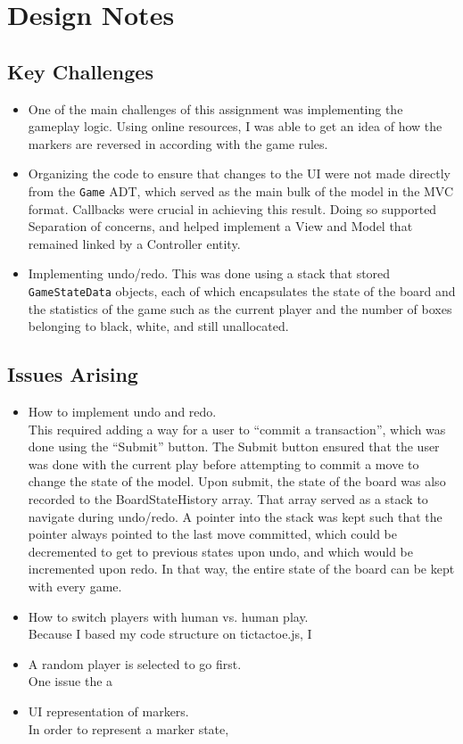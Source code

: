 \documentclass[11pt,letterpaper]{article}
\begin{document}
\section{Design Notes}
\subsection{Key Challenges}
\begin{itemize}
\item One of the main challenges of this assignment was implementing the gameplay logic. Using online resources, I was able to get an idea of how the markers are reversed in according with the game rules.
\item Organizing the code to ensure that changes to the UI were not made directly from the \texttt{Game} ADT, which served as the main bulk of the model in the MVC format. Callbacks were crucial in achieving this result. Doing so supported Separation of concerns, and helped implement a View and Model that remained linked by a Controller entity.
\item Implementing undo/redo. This was done using a stack that stored \texttt{GameStateData} objects, each of which encapsulates the state of the board and the statistics of the game such as the current player and the number of boxes belonging to black, white, and still unallocated. 
\end{itemize}

\subsection{Issues Arising}
\begin{itemize}
\item How to implement undo and redo.\\
This required adding a way for a user to ``commit a transaction'', which was done using the ``Submit'' button. The Submit button ensured that the user was done with the current play before attempting to commit a move to change the state of the model. Upon submit, the state of the board was also recorded to the BoardStateHistory array. That array served as a stack to navigate during undo/redo. A pointer into the stack was kept such that the pointer always pointed to the last move committed, which could be decremented to get to previous states upon undo, and which would be incremented upon redo. In that way, the entire state of the board can be kept with every game.
\item How to switch players with human vs. human play.\\
Because I based my code structure on tictactoe.js, I 
\item A random player is selected to go first.\\
One issue the a
\item UI representation of markers.\\
In order to represent a marker state,
\end{itemize}
\end{document}
